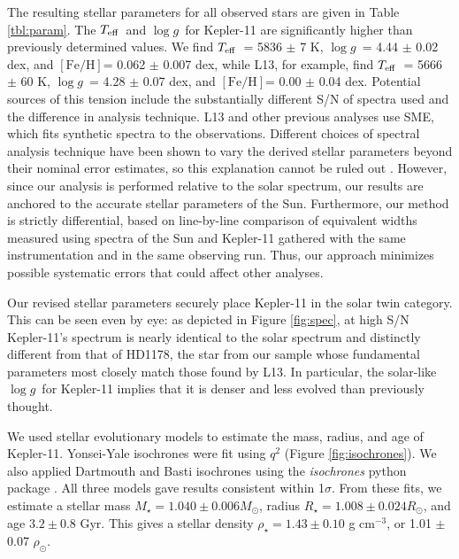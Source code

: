\documentclass[twocolumn]{aastex61}
\newcommand{\teff}{$T_{\rm eff}$}
\newcommand{\logg}{$\log g$}
\newcommand{\feh}{$\mathrm{[Fe/H]}$}
\newcommand{\gcm}{g cm$^{-3}$}
\begin{document}
The resulting stellar parameters for all observed stars are given in Table \ref{tbl:param}. The \teff\ and \logg\ for Kepler-11 are significantly higher than previously determined values. We find \teff\ = 5836 $\pm$ 7 K, \logg\ = 4.44 $\pm$ 0.02 dex, and \feh = 0.062 $\pm$ 0.007 dex, while L13, for example, find \teff\ = 5666 $\pm$ 60 K, \logg\ = 4.28 $\pm$ 0.07 dex, and \feh = 0.00 $\pm$ 0.04 dex. Potential sources of this tension include the substantially different S/N of spectra used and the difference in analysis technique. L13 and other previous analyses use SME, which fits synthetic spectra to the observations. Different choices of spectral analysis technique have been shown to vary the derived stellar parameters beyond their nominal error estimates, so this explanation cannot be ruled out \citep{Hinkel2016}. However, since our analysis is performed relative to the solar spectrum, our results are anchored to the accurate stellar parameters of the Sun. Furthermore, our method is strictly differential, based on line-by-line comparison of equivalent widths measured using spectra of the Sun and Kepler-11 gathered with the same instrumentation and in the same observing run. Thus, our approach minimizes possible systematic errors that could affect other analyses.

Our revised stellar parameters securely place Kepler-11 in the solar twin category. This can be seen even by eye: as depicted in Figure \ref{fig:spec}, at high S/N Kepler-11's spectrum is nearly identical to the solar spectrum and distinctly different from that of HD1178, the star from our sample whose fundamental parameters most closely match those found by L13. In particular, the solar-like \logg\ for Kepler-11 implies that it is denser and less evolved than previously thought.

We used stellar evolutionary models to estimate the mass, radius, and age of Kepler-11. Yonsei-Yale isochrones were fit using $q^2$ (Figure \ref{fig:isochrones}). We also applied Dartmouth and Basti isochrones using the \textit{isochrones} python package \citep{Morton2015}. All three models gave results consistent within 1$\sigma$. From these fits, we estimate a stellar mass $M_{\star} = 1.040 \pm 0.006 M_{\odot}$, radius $R_{\star} = 1.008 \pm 0.024 R_{\odot}$, and age $3.2 \pm 0.8$ Gyr. This gives a stellar density $\rho_{\star} = 1.43 \pm 0.10$ \gcm, or 1.01 $\pm$ 0.07 $\rho_{\odot}$.  %
\end{document}
